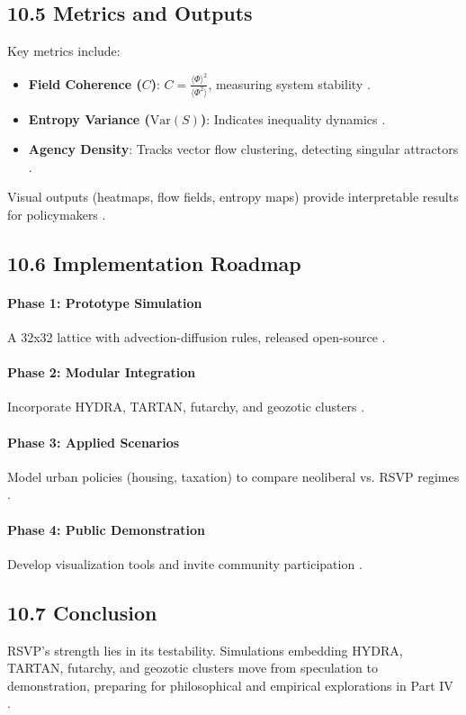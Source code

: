 \documentclass[12pt]{article}
\begin{document}
\subsection*{10.5 Metrics and Outputs}
Key metrics include:
\begin{itemize}
    \item \textbf{Field Coherence (\(C\))}: \(C = \frac{\langle \Phi \rangle^2}{\langle \Phi^2 \rangle}\), measuring system stability \citep{gromov1999}.
    \item \textbf{Entropy Variance (\(\mathrm{Var}(S)\))}: Indicates inequality dynamics \citep{shannon1948}.
    \item \textbf{Agency Density}: Tracks vector flow clustering, detecting singular attractors \citep{pearl2009}.
\end{itemize}
Visual outputs (heatmaps, flow fields, entropy maps) provide interpretable results for policymakers \citep{milewski2018}.

\subsection*{10.6 Implementation Roadmap}
\paragraph{Phase 1: Prototype Simulation}
A 32x32 lattice with advection-diffusion rules, released open-source \citep{bird1988}.
\paragraph{Phase 2: Modular Integration}
Incorporate HYDRA, TARTAN, futarchy, and geozotic clusters \citep{milewski2018}.
\paragraph{Phase 3: Applied Scenarios}
Model urban policies (housing, taxation) to compare neoliberal vs. RSVP regimes \citep{zuboff2019}.
\paragraph{Phase 4: Public Demonstration}
Develop visualization tools and invite community participation \citep{hanson2003}.

\subsection*{10.7 Conclusion}
RSVP's strength lies in its testability. Simulations embedding HYDRA, TARTAN, futarchy, and geozotic clusters move from speculation to demonstration, preparing for philosophical and empirical explorations in Part IV \citep{whitehead1978}.
\end{document}
